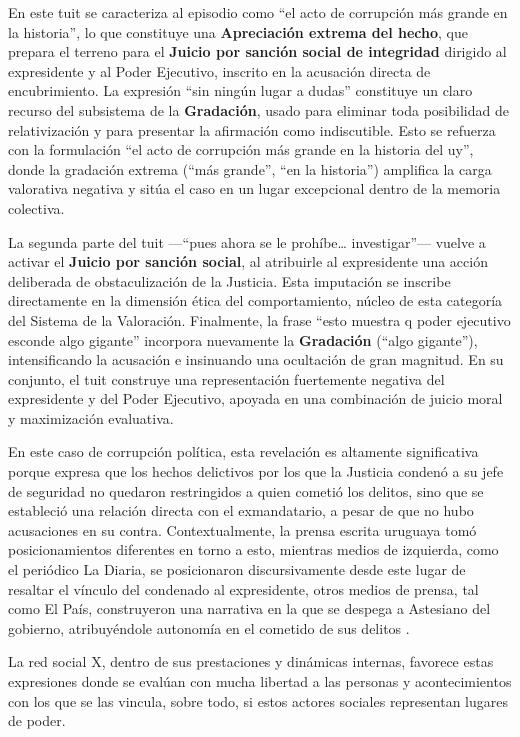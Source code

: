 \documentclass[spanish]{textolivre}
\begin{document}
En este tuit se caracteriza al episodio como “el acto de corrupción más grande en la historia”, lo que constituye una \textbf{Apreciación extrema del hecho}, que prepara el terreno para el \textbf{Juicio por sanción social de integridad} dirigido al expresidente y al Poder Ejecutivo, inscrito en la acusación directa de encubrimiento. La expresión “sin ningún lugar a dudas” constituye un claro recurso del subsistema de la \textbf{Gradación}, usado para eliminar toda posibilidad de relativización y para presentar la afirmación como indiscutible. Esto se refuerza con la formulación “el acto de corrupción más grande en la historia del uy”, donde la gradación extrema (“más grande”, “en la historia”) amplifica la carga valorativa negativa y sitúa el caso en un lugar excepcional dentro de la memoria colectiva.

La segunda parte del tuit —“pues ahora se le prohíbe… investigar”— vuelve a activar el \textbf{Juicio por sanción social}, al atribuirle al expresidente una acción deliberada de obstaculización de la Justicia. Esta imputación se inscribe directamente en la dimensión ética del comportamiento, núcleo de esta categoría del Sistema de la Valoración. Finalmente, la frase “esto muestra q poder ejecutivo esconde algo gigante” incorpora nuevamente la \textbf{Gradación} (“algo gigante”), intensificando la acusación e insinuando una ocultación de gran magnitud. En su conjunto, el tuit construye una representación fuertemente negativa del expresidente y del Poder Ejecutivo, apoyada en una combinación de juicio moral y maximización evaluativa.

En este caso de corrupción política, esta revelación es altamente significativa porque expresa que los hechos delictivos por los que la Justicia condenó a su jefe de seguridad no quedaron restringidos a quien cometió los delitos, sino que se estableció una relación directa con el exmandatario, a pesar de que no hubo acusaciones en su contra. Contextualmente, la prensa escrita uruguaya tomó posicionamientos diferentes en torno a esto, mientras medios de izquierda, como el periódico La Diaria, se posicionaron discursivamente desde este lugar de resaltar el vínculo del condenado al expresidente, otros medios de prensa, tal como El País, construyeron una narrativa en la que se despega a Astesiano del gobierno, atribuyéndole autonomía en el cometido de sus delitos \cite{gambetta2027narrativas}.

La red social X, dentro de sus prestaciones y dinámicas internas, favorece estas expresiones donde se evalúan con mucha libertad a las personas y acontecimientos con los que se las vincula, sobre todo, si estos actores sociales representan lugares de poder.
\end{document}
